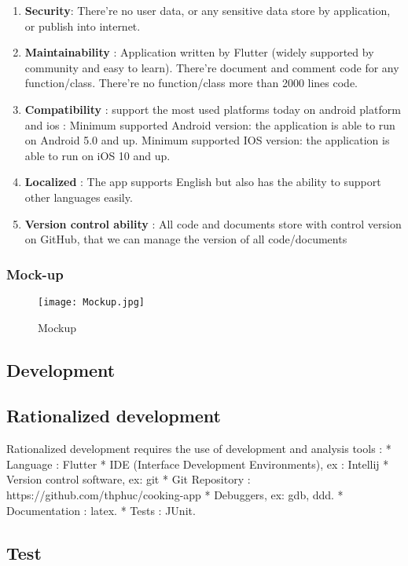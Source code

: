 \documentclass{article}
\begin{document}
\begin{enumerate}
\item \textbf{Security}: There’re no user data, or any sensitive data store by application, or publish into internet. 
\item \textbf{Maintainability} : Application written by Flutter (widely supported by community and easy to learn). There’re document and comment code for any function/class. There’re no function/class more than 2000 lines code. 
\item \textbf{Compatibility} : support the most used platforms today on android platform and ios :  Minimum supported Android version: the application is able to run on Android 5.0 and up.  Minimum supported IOS version: the application is able to run on iOS 10 and up. 
\item \textbf{Localized} : The app supports English but also has the ability to support other languages easily. 
\item \textbf{Version control ability} : All code and documents store with control version on GitHub, that we can manage the version of all code/documents 
\end{enumerate}

\subsubsection{ Mock-up}

\begin{figure}[h!]
\centering
\texttt{[image: Mockup.jpg]}
\caption{Mockup}
\label{fig:Mockup}
\end{figure}


\subsection{ Development}

\subsection{ Rationalized development}
Rationalized development requires the use of development and analysis tools :
* Language : Flutter  
* IDE (Interface Development Environments), ex : Intellij 
* Version control software, ex: git 
* Git Repository : https://github.com/thphuc/cooking-app  
* Debuggers, ex: gdb, ddd.
* Documentation : latex.
* Tests : JUnit.

\subsection{ Test }
\end{document}
